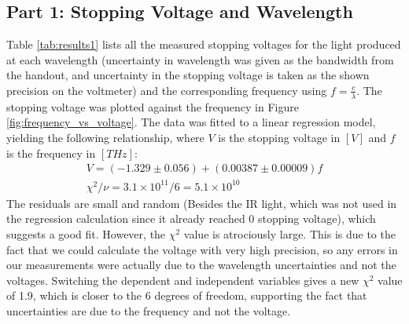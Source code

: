 \subsection{Part 1: Stopping Voltage and Wavelength}
\label{sec:results1}
Table \ref{tab:results1} lists all the measured stopping voltages for the light produced at each wavelength (uncertainty in wavelength was given as the bandwidth from the handout, and uncertainty in the stopping voltage is taken as the shown precision on the voltmeter) and the corresponding frequency using $f = \frac{c}{\lambda}$. The stopping voltage was plotted against the frequency in Figure \ref{fig:frequency_vs_voltage}. The data was fitted to a linear regression model, yielding the following relationship, where $V$ is the stopping voltage in $[V]$ and $f$ is the frequency in $[THz]$:
\begin{gather}
    V = (-1.329 \pm 0.056) + (0.00387 \pm 0.00009)f \\
    \chi^2 / \nu = 3.1 \times 10^{11} / 6 = 5.1 \times 10^{10}
\end{gather}
The residuals are small and random (Besides the IR light, which was not used in the regression calculation since it already reached 0 stopping voltage), which suggests a good fit. However, the $\chi^2$ value is atrociously large. This is due to the fact that we could calculate the voltage with very high precision, so any errors in our measurements were actually due to the wavelength uncertainties and not the voltages. Switching the dependent and independent variables gives a new $\chi^2$ value of 1.9, which is closer to the 6 degrees of freedom, supporting the fact that uncertainties are due to the frequency and not the voltage.


